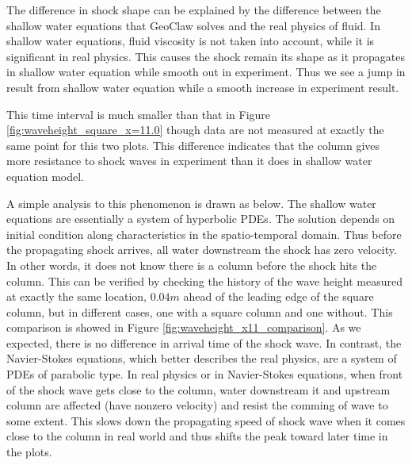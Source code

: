 \documentclass[11pt]{article}
\begin{document}
The difference in shock shape can be explained by the difference between the shallow water equations that GeoClaw solves and the real physics of fluid. 
In shallow water equations, fluid viscosity is not taken into account, while it is significant in real physics.
This causes the shock remain its shape as it propagates in shallow water equation while smooth out in experiment.
Thus we see a jump in result from shallow water equation while a smooth increase in experiment result.
\par
This time interval is much smaller than that in Figure \ref{fig:waveheight_square_x=11.0} though data are not measured at exactly the same point for this two plots. 
This difference indicates that the column gives more resistance to shock waves in experiment than it does in shallow water equation model. 
\par
A simple analysis to this phenomenon is drawn as below.
The shallow water equations are essentially a system of hyperbolic PDEs. The solution depends on initial condition along characteristics in the spatio-temporal domain. 
Thus before the propagating shock arrives, all water downstream the shock has zero velocity. 
In other words, it does not know there is a column before the shock hits the column.
This can be verified by checking the history of the wave height measured at exactly the same location, $0.04m$ ahead of the leading edge of the square column, but in different cases, one with a square column and one without.
This comparison is showed in Figure \ref{fig:waveheight_x11_comparison}. As we expected, there is no difference in arrival time of the shock wave.
In contrast, the Navier-Stokes equations, which better describes the real physics, are a system of PDEs of parabolic type. 
In real physics or in Navier-Stokes equations, when front of the shock wave gets close to the column, water downstream it and upstream column are affected (have nonzero velocity) and resist the comming of wave to some extent. 
This slows down the propagating speed of shock wave when it comes close to the column in real world and thus shifts the peak toward later time in the plots.
\end{document}
